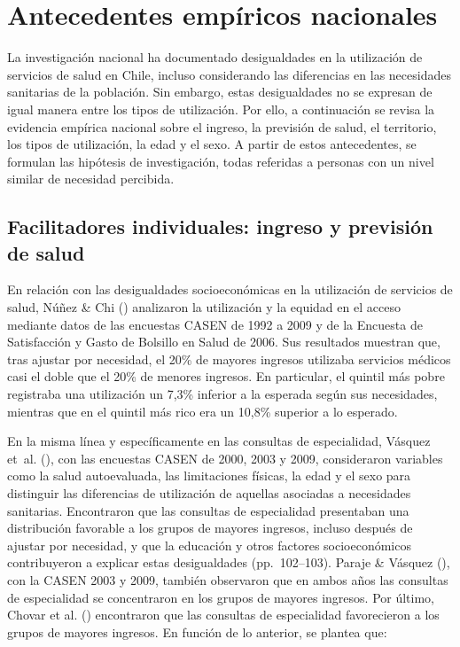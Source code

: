 \documentclass[
  spanish,
  a4paper,
  oneside]{scrbook}
\begin{document}
\section{Antecedentes empíricos
nacionales}\label{antecedentes-empuxedricos-nacionales}

La investigación nacional ha documentado desigualdades en la utilización
de servicios de salud en Chile, incluso considerando las diferencias en
las necesidades sanitarias de la población. Sin embargo, estas
desigualdades no se expresan de igual manera entre los tipos de
utilización. Por ello, a continuación se revisa la evidencia empírica
nacional sobre el ingreso, la previsión de salud, el territorio, los
tipos de utilización, la edad y el sexo. A partir de estos antecedentes,
se formulan las hipótesis de investigación, todas referidas a personas
con un nivel similar de necesidad percibida.

\subsection{Facilitadores individuales: ingreso y previsión de
salud}\label{facilitadores-individuales-ingreso-y-previsiuxf3n-de-salud}

En relación con las desigualdades socioeconómicas en la utilización de
servicios de salud, Núñez \& Chi
() analizaron la utilización y la
equidad en el acceso mediante datos de las encuestas CASEN de 1992 a
2009 y de la Encuesta de Satisfacción y Gasto de Bolsillo en Salud de
2006. Sus resultados muestran que, tras ajustar por necesidad, el 20\%
de mayores ingresos utilizaba servicios médicos casi el doble que el
20\% de menores ingresos. En particular, el quintil más pobre registraba
una utilización un 7,3\% inferior a la esperada según sus necesidades,
mientras que en el quintil más rico era un 10,8\% superior a lo
esperado.

En la misma línea y específicamente en las consultas de especialidad,
Vásquez et~al. (), con
las encuestas CASEN de 2000, 2003 y 2009, consideraron variables como la
salud autoevaluada, las limitaciones físicas, la edad y el sexo para
distinguir las diferencias de utilización de aquellas asociadas a
necesidades sanitarias. Encontraron que las consultas de especialidad
presentaban una distribución favorable a los grupos de mayores ingresos,
incluso después de ajustar por necesidad, y que la educación y otros
factores socioeconómicos contribuyeron a explicar estas desigualdades
(pp.~102--103). Paraje \& Vásquez
(), con la CASEN 2003 y 2009,
también observaron que en ambos años las consultas de especialidad se
concentraron en los grupos de mayores ingresos. Por último, Chovar et
al. () encontraron que
las consultas de especialidad favorecieron a los grupos de mayores
ingresos. En función de lo anterior, se plantea que:
\end{document}
